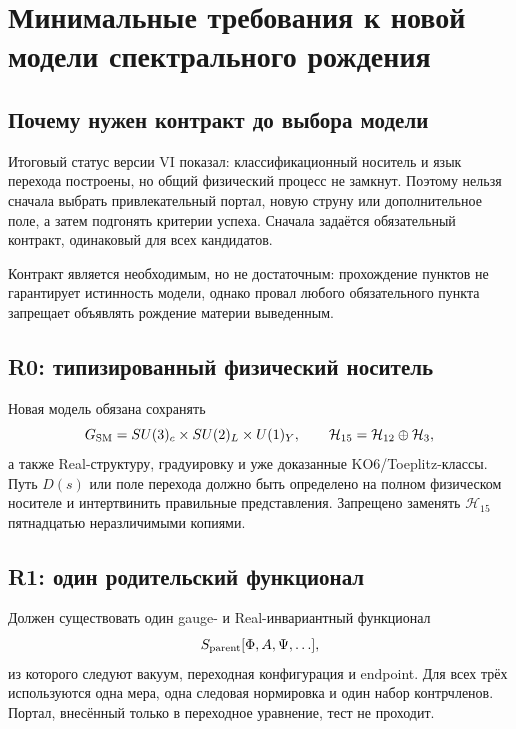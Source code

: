 \chapter{Минимальные требования к новой модели спектрального рождения}
\label{ch:v6-spectral-transition-new-model-minimal-requirements-gate}

\section{Почему нужен контракт до выбора модели}

Итоговый статус версии VI показал: классификационный носитель и язык
перехода построены, но общий физический процесс не замкнут. Поэтому нельзя
сначала выбрать привлекательный портал, новую струну или дополнительное
поле, а затем подгонять критерии успеха. Сначала задаётся обязательный
контракт, одинаковый для всех кандидатов.

Контракт является необходимым, но не достаточным: прохождение пунктов не
гарантирует истинность модели, однако провал любого обязательного пункта
запрещает объявлять рождение материи выведенным.

\section{R0: типизированный физический носитель}

Новая модель обязана сохранять
\begin{equation}
 G_{\rm SM}=SU(3)_c\times SU(2)_L\times U(1)_Y,
 \qquad
 \mathcal H_{15}=\mathcal H_{12}\oplus\mathcal H_3,
\end{equation}
а также Real-структуру, градуировку и уже доказанные KO6/Toeplitz-классы.
Путь $D(s)$ или поле перехода должно быть определено на полном физическом
носителе и интертвинить правильные представления. Запрещено заменять
$\mathcal H_{15}$ пятнадцатью неразличимыми копиями.

\section{R1: один родительский функционал}

Должен существовать один gauge- и Real-инвариантный функционал
\begin{equation}
 S_{\rm parent}[\Phi,A,\Psi,\ldots],
\end{equation}
из которого следуют вакуум, переходная конфигурация и endpoint. Для всех
трёх используются одна мера, одна следовая нормировка и один набор
контрчленов. Портал, внесённый только в переходное уравнение, тест не
проходит.

